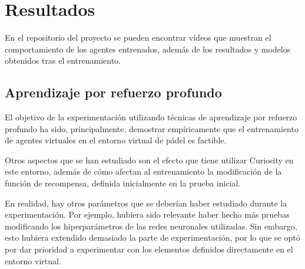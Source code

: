 \chapter{Resultados}\label{chapter:resultados}

En el repositorio del proyecto \cite{padel-project} se pueden encontrar vídeos que muestran el comportamiento de los agentes entrenados, además de los resultados y modelos obtenidos tras el entrenamiento.

\section{Aprendizaje por refuerzo profundo}

El objetivo de la experimentación utilizando técnicas de aprendizaje por refuerzo profundo ha sido, principalmente, demostrar empíricamente que el entrenamiento de agentes virtuales en el entorno virtual de pádel es factible.

Otros aspectos que se han estudiado son el efecto que tiene utilizar Curiosity en este entorno, además de cómo afectan al entrenamiento la modificación de la función de recompensa, definida inicialmente en la prueba inicial.

En realidad, hay otros parámetros que se deberían haber estudiado durante la experimentación. Por ejemplo, hubiera sido relevante haber hecho más pruebas modificando los hiperparámetros de las redes neuronales utilizadas. Sin embargo, esto hubiera extendido demasiado la parte de experimentación, por lo que se optó por dar prioridad a experimentar con los elementos definidos directamente en el entorno virtual.

